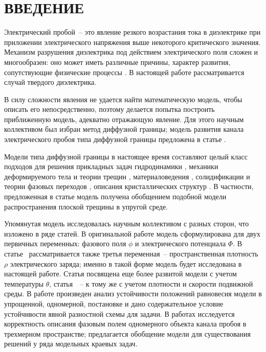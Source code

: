 
\clearpage
\section*{ВВЕДЕНИЕ}

Электрический пробой~-- это явление резкого возрастания тока в диэлектрике при приложении электрического напряжения выше некоторого критического значения. Механизм разрушения диэлектрика под действием электрического поля сложен и многообразен: оно может иметь различные причины, характер развития, сопутствующие физические процессы \cite{vorobiev_dielectric_physics}. В настоящей работе рассматривается случай твердого диэлектрика.

В силу сложности явления не удается найти математическую модель, чтобы описать его непосредственно, поэтому делается попытка построить приближенную модель, адекватно отражающую явление. Для этого научным коллективом был избран метод диффузной границы; модель развития канала электрического пробоя типа диффузной границы предложена в статье \cite{pitike_dielectric_breakdown}.

Модели типа диффузной границы в настоящее время составляют целый класс подходов для решения прикладных задач гидродинамики \cite{lamorgese_flow_modeling, kim_fluid_flows, xu_hydrodynamics}, механики деформируемого тела и теории трещин \cite{ambati_fracture}, материаловедения \cite{provatas_materials}, солидификации и теории фазовых переходов \cite{boettinger_solidification, cartalade_phase_separation, gransaly_solidification}, описания кристаллических структур \cite{emmerich_crystal, asadi_crystal, provatas_crystal}. В частности, предложенная в статье \cite{pitike_dielectric_breakdown} модель получена обобщением подобной модели распространения плоской трещины в упругой среде.

Упомянутая модель исследовалась научным коллективом с разных сторон, что изложено в ряде статей. В оригинальной работе \cite{pitike_dielectric_breakdown} модель сформулирована для двух первичных переменных: фазового поля $\phi$ и электрического потенциала $\Phi$. В статье~\cite{zipunova_computational} рассматривается также третья переменная~-- пространственная плотность $\rho$ электрического заряда; именно в такой форме модель будет исследована в настоящей работе. Статья \cite{zipunova_conservative} посвящена еще более развитой модели с учетом температуры $\theta$, статья~\cite{zipunova_thermomechanical}~-- к тому же с учетом плотности и скорости подвижной среды. В работе \cite{ponomarev_stability} произведен анализ устойчивости положений равновесия модели в упрощенной, одномерной, постановке и дано содержательное условие устойчивости явной разностной схемы для задачи. В работах \cite{zipunova_higher_codimension, ponomarev_generalization} исследуется корректность описания фазовым полем одномерного объекта канала пробоя в трехмерном пространстве; предлагается обобщение модели для существования решений у ряда модельных краевых задач.

